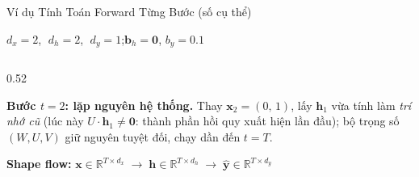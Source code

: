 \documentclass[aspectratio=169, 10pt]{beamer}
\begin{document}
\begin{frame}[fragile]{Ví dụ Tính Toán Forward Từng Bước (số cụ thể)}

\begin{center}
\footnotesize
$d_x = 2$, $\;d_h = 2$, $\;d_y = 1$;\quad $\mathbf{b}_h = \mathbf{0}$,\; $b_y = 0.1$
\end{center}

\vspace{0.05cm}
\begin{columns}[T]

\begin{column}{0.52\textwidth}
\scriptsize
\setlength{\tabcolsep}{2.5pt}
\renewcommand{\arraystretch}{1.1}

\vspace{0.08cm}
\footnotesize
\textbf{Bước $t = 2$: lặp nguyên hệ thống.} Thay $\mathbf{x}_2 = (0,\, 1)$, lấy $\mathbf{h}_1$ vừa tính làm \emph{trí nhớ cũ} (lúc này $U \cdot \mathbf{h}_1 \neq \mathbf{0}$: thành phần hồi quy xuất hiện lần đầu); bộ trọng số $(W, U, V)$ giữ nguyên tuyệt đối, chạy dần đến $t = T$.

\vspace{0.08cm}
\begin{center}
\textbf{Shape flow:}\; $\mathbf{x} \in \mathbb{R}^{T \times d_x} \;\longrightarrow\; \mathbf{h} \in \mathbb{R}^{T \times d_h} \;\longrightarrow\; \hat{\mathbf{y}} \in \mathbb{R}^{T \times d_y}$
\end{center}
\end{column}


\end{columns}
\end{frame}
\end{document}
